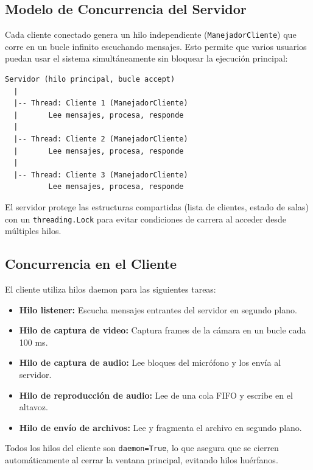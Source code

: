 \documentclass[12pt,a4paper]{article}
\begin{document}
\subsection{Modelo de Concurrencia del Servidor}

Cada cliente conectado genera un hilo independiente (\texttt{ManejadorCliente}) que corre en un bucle infinito escuchando mensajes. Esto permite que varios usuarios puedan usar el sistema simult\'aneamente sin bloquear la ejecuci\'on principal:

\begin{lstlisting}[frame=single, basicstyle=\footnotesize\ttfamily, numbers=none]
Servidor (hilo principal, bucle accept)
  |
  |-- Thread: Cliente 1 (ManejadorCliente)
  |       Lee mensajes, procesa, responde
  |
  |-- Thread: Cliente 2 (ManejadorCliente)
  |       Lee mensajes, procesa, responde
  |
  |-- Thread: Cliente 3 (ManejadorCliente)
          Lee mensajes, procesa, responde
\end{lstlisting}

El servidor protege las estructuras compartidas (lista de clientes, estado de salas) con un \texttt{threading.Lock} para evitar condiciones de carrera al acceder desde m\'ultiples hilos.

\subsection{Concurrencia en el Cliente}

El cliente utiliza hilos daemon para las siguientes tareas:

\begin{itemize}
    \item \textbf{Hilo listener:} Escucha mensajes entrantes del servidor en segundo plano.
    \item \textbf{Hilo de captura de video:} Captura frames de la c\'amara en un bucle cada 100 ms.
    \item \textbf{Hilo de captura de audio:} Lee bloques del micr\'ofono y los env\'ia al servidor.
    \item \textbf{Hilo de reproducci\'on de audio:} Lee de una cola FIFO y escribe en el altavoz.
    \item \textbf{Hilo de env\'io de archivos:} Lee y fragmenta el archivo en segundo plano.
\end{itemize}

Todos los hilos del cliente son \texttt{daemon=True}, lo que asegura que se cierren autom\'aticamente al cerrar la ventana principal, evitando hilos hu\'erfanos.
\end{document}
